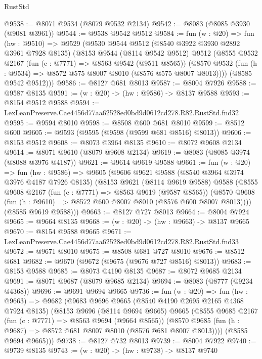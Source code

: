 \begin{lexlean}{RustStd}
\begin{coremodule}
@9538 := @8071 @9534 (@8079 @9532 @2134)
@9542 := @8083 (@8085 @3930 (@9081 @3961))
@9544 := @9538 @9542 @9512
@9584 := fun (w : @20) =>
  fun (hw : @9510) =>
  @9529
    (@9530
      @9544
      @9512
      (@8540 @3922 @3930 @2892 @3961 @7928 @8135)
      (@8153
        @9544
        (@8114 @9542 @9512)
        @9512
        (@8555
          @9532
          @2167
          (fun (c : @7771) => @8563 @9542 (@9511 @8565))
          (@8570 @9532 (fun (h : @9534) => @8572 @575 @8007 @8010 (@8576 @575 @8007 @8013))))
        (@8585 @9542 @9512)))
@9586 := @8127 @681 @8013
@9587 := @8004 @7926
@9588 := @9587 @8135
@9591 := (w : @20) -> (hw : @9586) -> @8137 @9588
@9593 := @8154 @9512 @9588
@9594 := LexLeanPreserve.Cae4456d77aa62528ed0bd9d0612cd278.R82.RustStd.fnd32
@9595 := @9594 @8010
@9598 := @8508 @600 @681 @8010
@9599 := @8512 @600
@9605 := @9593 (@9595 (@9598 (@9599 @681 @8516) @8013))
@9606 := @8153 @9512
@9608 := @8073 @3964 @8135
@9610 := @8072 @9608 @2134
@9614 := @8071 @9610 (@8079 @9608 @2134)
@9619 := @8083 (@8085 @3974 (@8088 @3976 @4187))
@9621 := @9614 @9619 @9588
@9661 := fun (w : @20) =>
  fun (hw : @9586) =>
  @9605
    (@9606
      @9621
      @9588
      (@8540 @3964 @3974 @3976 @4187 @7926 @8135)
      (@8153
        @9621
        (@8114 @9619 @9588)
        @9588
        (@8555
          @9608
          @2167
          (fun (c : @7771) => @8563 @9619 (@9587 @8565))
          (@8570 @9608 (fun (h : @9610) => @8572 @600 @8007 @8010 (@8576 @600 @8007 @8013))))
        (@8585 @9619 @9588)))
@9663 := @8127 @727 @8013
@9664 := @8004 @7924
@9665 := @9664 @8135
@9668 := (w : @20) -> (hw : @9663) -> @8137 @9665
@9670 := @8154 @9588 @9665
@9671 := LexLeanPreserve.Cae4456d77aa62528ed0bd9d0612cd278.R82.RustStd.fnd33
@9672 := @9671 @8010
@9675 := @8508 @681 @727 @8010
@9676 := @8512 @681
@9682 := @9670 (@9672 (@9675 (@9676 @727 @8516) @8013))
@9683 := @8153 @9588
@9685 := @8073 @4190 @8135
@9687 := @8072 @9685 @2134
@9691 := @8071 @9687 (@8079 @9685 @2134)
@9694 := @8083 (@8777 (@9234 @4368))
@9696 := @9691 @9694 @9665
@9736 := fun (w : @20) =>
  fun (hw : @9663) =>
  @9682
    (@9683
      @9696
      @9665
      (@8540 @4190 @2695 @2165 @4368 @7924 @8135)
      (@8153
        @9696
        (@8114 @9694 @9665)
        @9665
        (@8555
          @9685
          @2167
          (fun (c : @7771) => @8563 @9694 (@9664 @8565))
          (@8570 @9685 (fun (h : @9687) => @8572 @681 @8007 @8010 (@8576 @681 @8007 @8013))))
        (@8585 @9694 @9665)))
@9738 := @8127 @732 @8013
@9739 := @8004 @7922
@9740 := @9739 @8135
@9743 := (w : @20) -> (hw : @9738) -> @8137 @9740

\end{coremodule}
\end{lexlean}
